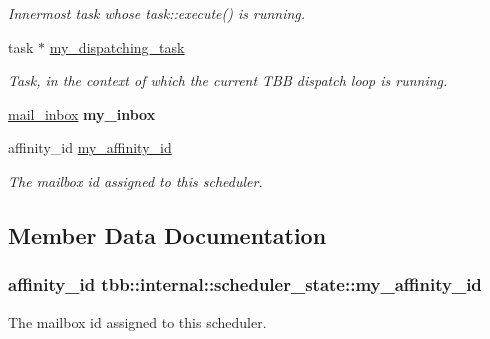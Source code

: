 \begin{DoxyCompactItemize}
\begin{DoxyCompactList}\small\item\em Innermost task whose task\+::execute() is running. \end{DoxyCompactList}\item 
task $\ast$ \hyperlink{structtbb_1_1internal_1_1scheduler__state_a65d38ed67db424dde8e838e333b09a34}{my\+\_\+dispatching\+\_\+task}
\begin{DoxyCompactList}\small\item\em Task, in the context of which the current T\+B\+B dispatch loop is running. \end{DoxyCompactList}\item 
\hypertarget{structtbb_1_1internal_1_1scheduler__state_a5b120ea3121cd82f578eef2c1319f9fe}{}\hyperlink{classtbb_1_1internal_1_1mail__inbox}{mail\+\_\+inbox} {\bfseries my\+\_\+inbox}\label{structtbb_1_1internal_1_1scheduler__state_a5b120ea3121cd82f578eef2c1319f9fe}

\item 
affinity\+\_\+id \hyperlink{structtbb_1_1internal_1_1scheduler__state_a3a635bad42d492013d4a06d1af0c452b}{my\+\_\+affinity\+\_\+id}
\begin{DoxyCompactList}\small\item\em The mailbox id assigned to this scheduler. \end{DoxyCompactList}\end{DoxyCompactItemize}


\subsection{Member Data Documentation}
\hypertarget{structtbb_1_1internal_1_1scheduler__state_a3a635bad42d492013d4a06d1af0c452b}{}
\subsubsection[{my\+\_\+affinity\+\_\+id}]{\setlength{\rightskip}{0pt plus 5cm}affinity\+\_\+id tbb\+::internal\+::scheduler\+\_\+state\+::my\+\_\+affinity\+\_\+id}\label{structtbb_1_1internal_1_1scheduler__state_a3a635bad42d492013d4a06d1af0c452b}


The mailbox id assigned to this scheduler. 

